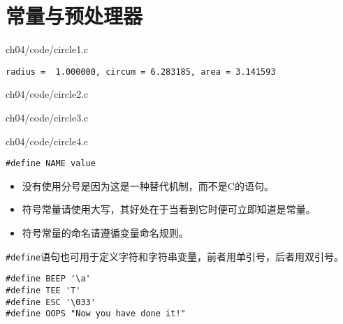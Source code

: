 \section{常量与预处理器}

\begin{frame}[fragile]\ft{\secname}

{ch04/code/circle1.c}
\end{frame}

\begin{frame}[fragile]\ft{\secname}
\begin{lstlisting}[backgroundcolor=\color{red!10}]
radius =  1.000000, circum = 6.283185, area = 3.141593
\end{lstlisting}
\end{frame}

\begin{frame}[fragile]\ft{\secname}

{ch04/code/circle2.c}
\end{frame}

\begin{frame}[fragile]\ft{\secname}

{ch04/code/circle3.c}
\end{frame}

\begin{frame}[fragile]\ft{\secname}

{ch04/code/circle4.c}

\end{frame}

\begin{frame}[fragile]
\begin{lstlisting}[title=宏定义的一般形式,backgroundcolor=\color{red!10}]
#define NAME value
\end{lstlisting}

\begin{itemize}
\item 没有使用分号是因为这是一种替代机制，而不是C的语句。\\[0.1in]
\item 符号常量请使用大写，其好处在于当看到它时便可立即知道是常量。\\[0.1in]
\item 符号常量的命名请遵循变量命名规则。
\end{itemize}
\end{frame}

\begin{frame}[fragile]
\lstinline|#define|语句也可用于定义字符和字符串变量，前者用单引号，后者用双引号。
\vspace{0.1in}

\begin{lstlisting}
#define BEEP '\a'
#define TEE 'T'
#define ESC '\033'
#define OOPS "Now you have done it!"
\end{lstlisting}

\end{frame}

